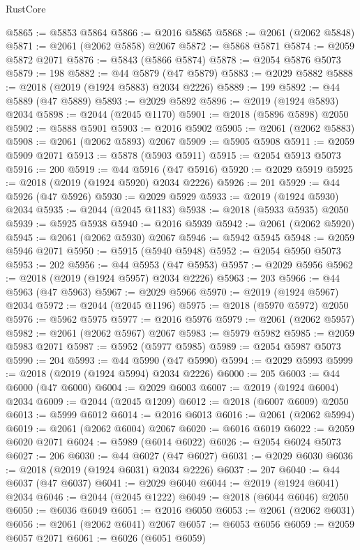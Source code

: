 \begin{lexlean}{RustCore}
\begin{coremodule}
@5865 := @5853 @5864
@5866 := @2016 @5865
@5868 := @2061 (@2062 @5848)
@5871 := @2061 (@2062 @5858) @2067
@5872 := @5868 @5871
@5874 := @2059 @5872 @2071
@5876 := @5843 (@5866 @5874)
@5878 := @2054 @5876 @5073
@5879 := 198
@5882 := @44 @5879 (@47 @5879)
@5883 := @2029 @5882
@5888 := @2018 (@2019 (@1924 @5883) @2034 @2226)
@5889 := 199
@5892 := @44 @5889 (@47 @5889)
@5893 := @2029 @5892
@5896 := @2019 (@1924 @5893) @2034
@5898 := @2044 (@2045 @1170)
@5901 := @2018 (@5896 @5898) @2050
@5902 := @5888 @5901
@5903 := @2016 @5902
@5905 := @2061 (@2062 @5883)
@5908 := @2061 (@2062 @5893) @2067
@5909 := @5905 @5908
@5911 := @2059 @5909 @2071
@5913 := @5878 (@5903 @5911)
@5915 := @2054 @5913 @5073
@5916 := 200
@5919 := @44 @5916 (@47 @5916)
@5920 := @2029 @5919
@5925 := @2018 (@2019 (@1924 @5920) @2034 @2226)
@5926 := 201
@5929 := @44 @5926 (@47 @5926)
@5930 := @2029 @5929
@5933 := @2019 (@1924 @5930) @2034
@5935 := @2044 (@2045 @1183)
@5938 := @2018 (@5933 @5935) @2050
@5939 := @5925 @5938
@5940 := @2016 @5939
@5942 := @2061 (@2062 @5920)
@5945 := @2061 (@2062 @5930) @2067
@5946 := @5942 @5945
@5948 := @2059 @5946 @2071
@5950 := @5915 (@5940 @5948)
@5952 := @2054 @5950 @5073
@5953 := 202
@5956 := @44 @5953 (@47 @5953)
@5957 := @2029 @5956
@5962 := @2018 (@2019 (@1924 @5957) @2034 @2226)
@5963 := 203
@5966 := @44 @5963 (@47 @5963)
@5967 := @2029 @5966
@5970 := @2019 (@1924 @5967) @2034
@5972 := @2044 (@2045 @1196)
@5975 := @2018 (@5970 @5972) @2050
@5976 := @5962 @5975
@5977 := @2016 @5976
@5979 := @2061 (@2062 @5957)
@5982 := @2061 (@2062 @5967) @2067
@5983 := @5979 @5982
@5985 := @2059 @5983 @2071
@5987 := @5952 (@5977 @5985)
@5989 := @2054 @5987 @5073
@5990 := 204
@5993 := @44 @5990 (@47 @5990)
@5994 := @2029 @5993
@5999 := @2018 (@2019 (@1924 @5994) @2034 @2226)
@6000 := 205
@6003 := @44 @6000 (@47 @6000)
@6004 := @2029 @6003
@6007 := @2019 (@1924 @6004) @2034
@6009 := @2044 (@2045 @1209)
@6012 := @2018 (@6007 @6009) @2050
@6013 := @5999 @6012
@6014 := @2016 @6013
@6016 := @2061 (@2062 @5994)
@6019 := @2061 (@2062 @6004) @2067
@6020 := @6016 @6019
@6022 := @2059 @6020 @2071
@6024 := @5989 (@6014 @6022)
@6026 := @2054 @6024 @5073
@6027 := 206
@6030 := @44 @6027 (@47 @6027)
@6031 := @2029 @6030
@6036 := @2018 (@2019 (@1924 @6031) @2034 @2226)
@6037 := 207
@6040 := @44 @6037 (@47 @6037)
@6041 := @2029 @6040
@6044 := @2019 (@1924 @6041) @2034
@6046 := @2044 (@2045 @1222)
@6049 := @2018 (@6044 @6046) @2050
@6050 := @6036 @6049
@6051 := @2016 @6050
@6053 := @2061 (@2062 @6031)
@6056 := @2061 (@2062 @6041) @2067
@6057 := @6053 @6056
@6059 := @2059 @6057 @2071
@6061 := @6026 (@6051 @6059)

\end{coremodule}
\end{lexlean}
